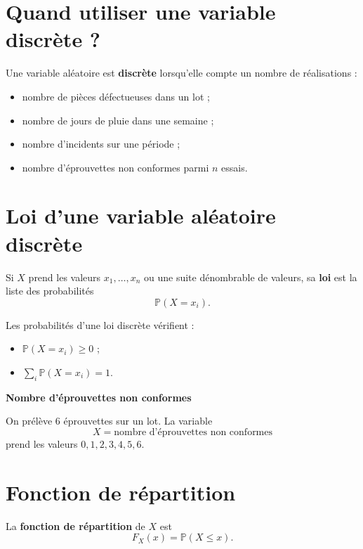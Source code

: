 
\section{Quand utiliser une variable discrète ?}

Une variable aléatoire est \textbf{discrète} lorsqu'elle compte un nombre de réalisations :
\begin{itemize}
    \item nombre de pièces défectueuses dans un lot ;
    \item nombre de jours de pluie dans une semaine ;
    \item nombre d'incidents sur une période ;
    \item nombre d'éprouvettes non conformes parmi $n$ essais.
\end{itemize}

\section{Loi d'une variable aléatoire discrète}

\begin{Def}
Si $X$ prend les valeurs $x_1,\dots,x_n$ ou une suite dénombrable de valeurs, sa \textbf{loi} est la liste des probabilités
$$
\mathbb{P}(X=x_i).
$$
\end{Def}

\begin{Prop}
Les probabilités d'une loi discrète vérifient :
\begin{itemize}
    \item $\mathbb{P}(X=x_i)\geq 0$ ;
    \item $\sum_i \mathbb{P}(X=x_i)=1$.
\end{itemize}
\end{Prop}

\begin{Ex}
\textbf{Nombre d'éprouvettes non conformes}

On prélève $6$ éprouvettes sur un lot. La variable
$$
X = \text{nombre d'éprouvettes non conformes}
$$
prend les valeurs $0,1,2,3,4,5,6$.
\end{Ex}

\section{Fonction de répartition}

\begin{Def}
La \textbf{fonction de répartition} de $X$ est
$$
F_X(x)=\mathbb{P}(X\leq x).
$$
\end{Def}

